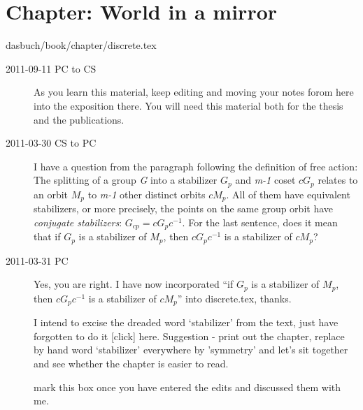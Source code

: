 \section{Chapter: World in a mirror}\noindent dasbuch/book/chapter/discrete.tex
\begin{description}

\item[2011-09-11 PC to  CS] As you learn this material, keep editing
 and moving your notes forom here into the exposition there.
You will need this material both for the thesis and the publications.

\item[2011-03-30  CS to PC]
I have a question from the paragraph
following the definition of free action: The splitting of a group
\emph{G} into a stabilizer \emph{$G_{p}$} and \emph{m-1} coset
\emph{$cG_{p}$} relates to an orbit \emph{$M_{p}$} to \emph{m-1} other
distinct orbits \emph{$cM_{p}$}. All of them have equivalent stabilizers,
or more precisely, the points on the same group orbit have
\emph{conjugate stabilizers}: \emph{$G_{cp} = cG_{p}c^{-1}$}. For the
last sentence, does it mean that if \emph{$G_{p}$}  is a stabilizer of
\emph{$M_{p}$}, then \emph{$cG_{p}c^{-1}$} is a stabilizer of
\emph{$cM_{p}$}?

\item[2011-03-31 PC] Yes, you are right. I have now incorporated ``if
\emph{$G_{p}$}  is a stabilizer of \emph{$M_{p}$}, then
\emph{$cG_{p}c^{-1}$} is a stabilizer of \emph{$cM_{p}$}'' into
discrete.tex, thanks.

I intend to excise the dreaded word `stabilizer' from the text, just have
forgotten to do it
{[click]} here. Suggestion - print out the chapter, replace by hand word
`stabilizer' everywhere by 'symmetry' and let's sit together and see
whether the chapter is  easier to read.

 mark this box once you have entered the
edits and discussed them with me.


\end{description}


